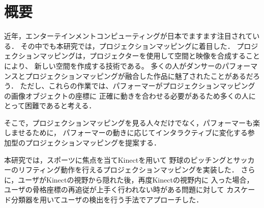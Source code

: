 \chapter*{概要}

近年，エンターテインメントコンピューティングが日本でますます注目されている．
その中でも本研究では，プロジェクションマッピングに着目した．
プロジェクションマッピングは，プロジェクターを使用して空間と映像を合成することにより、
新しい空間を作成する技術である。
多くの人がダンサーのパフォーマンスとプロジェクションマッピングが融合した作品に魅了されたことがあるだろう．
ただし、これらの作業では、パフォーマーがプロジェクションマッピングの画像オブジェクトの座標に
正確に動きを合わせる必要があるため多くの人にとって困難であると考える．

そこで，プロジェクションマッピングを見る人々だけでなく，パフォーマーも楽しませるために，
パフォーマーの動きに応じてインタラクティブに変化する参加型のプロジェクションマッピングを提案する．

本研究では，スポーツに焦点を当てKinectを用いて
野球のピッチングとサッカーのリフティング動作を行えるプロジェクションマッピングを実装した．
さらに，ユーザがKinectの視野から隠れた後，再度Kinectの視野内に
入った場合，ユーザの骨格座標の再追従が上手く行われない時がある問題に対して
カスケード分類器を用いてユーザの検出を行う手法でアプローチした．

